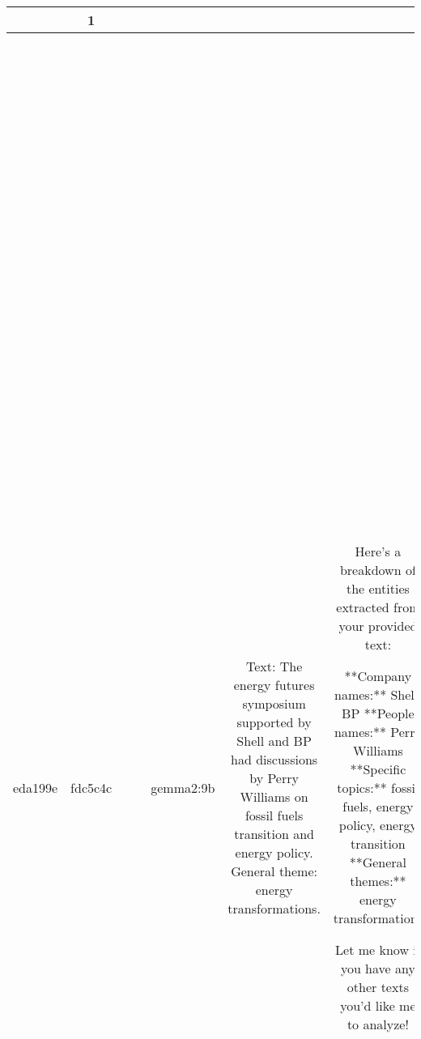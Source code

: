 \begin{table}[h!]
\begin{tabular}{|c|c|c|c|c|c|c|c|c|c|}
{- The section "Company names" is present and lists the companies correctly, separated by commas.
- "People names" is present, followed by a name.
- "Specific topics" and "General themes" sections are provided, with topics and themes listed using commas (though only one entry in the General themes list).

As the evaluation does not require correctness or verification with respect to input, and no part of the format is missing or incorrect, the output is compliant with the specified format outlined in the description.

No violation.
OK & 1\\
\hline
eda199e & fdc5c4c &  &  & gemma2:9b & Text: The energy futures symposium supported by Shell and BP had discussions by Perry Williams on fossil fuels transition and energy policy. General theme: energy transformations. & Here's a breakdown of the entities extracted from your provided text:

**Company names:** Shell, BP 
**People names:** Perry Williams
**Specific topics:**  fossil fuels, energy policy, energy transition
 **General themes:** energy transformations 


Let me know if you have any other texts you'd like me to analyze! 
 & ok & The output generally complies with the format described in the chatbot description. The extracted elements are clearly categorized under "Company names," "People names," "Specific topics," and "General themes." The lists for each category are comma-separated as required by the format. The introduction and conclusion with additional commentary ("Here's a breakdown of the entities extracted from your provided text:" and "Let me know if you have any other texts you'd like me to analyze!") are extra but do not violate the required format. These sections can be ignored in this compliance check as they do not contravene the structural requirements set by the description.

No violations regarding the format occur in the core extracted content.

OK & 1\\
\hline
eda199e & fdc5c4c &  &  & qwen2.5:3b & Text: The energy futures symposium supported by Shell and BP had discussions by Perry Williams on fossil fuels transition and energy policy. General theme: energy transformations. & ```json
Company names: Shell, BP
People names: -||-
Specific topics: -||-
General themes: energy transformations
```

### Explanation:
- **Company names:** The text mentions two companies "Shell" and "BP". These are extracted as Company names.
  
}
\end{tabular}
\end{table}
